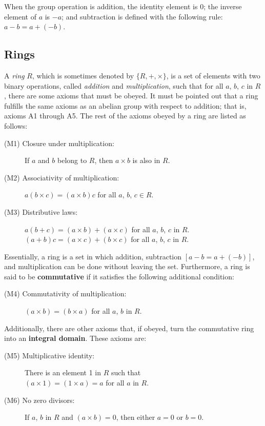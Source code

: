When the group operation is addition, the identity element is 0; the inverse element of $a$ is $-a$; and subtraction is defined with the following rule: $a-b = a+(-b)$. 
  
\subsection{Rings}

A \emph{ring} $R$, which is sometimes denoted by $\{R, +, \times \}$, is a set of elements with two binary operations, called \textit{addition} and \textit{multiplication}, such that for all $a$, $b$, $c$ in $R$, there are some axioms that must be obeyed. It must be pointed out that a ring fulfills the same axioms as an abelian group with respect to addition; that is, axioms A1 through A5. The rest of the axioms obeyed by a ring are listed as follows:
\begin{description}
\item[(M1) Closure under multiplication:] If $a$ and $b$ belong to $R$, then $a \times b$ is also in $R$.
\item[(M2) Associativity of multiplication:] $a(b \times c) = (a \times b)c$ for all $a$, $b$, $c \in R$.
\item[(M3) Distributive laws:] $a(b+c) = (a \times b) + (a \times c)$ for all $a$, $b$, $c$ in $R$. \\ $(a+b)c = (a \times c) + (b \times c)$ for all $a$, $b$, $c$ in $R$.
\end{description}

Essentially, a ring is a set in which addition, subtraction $[a-b = a + (-b)]$, and multiplication can be done without leaving the set. Furthermore, a ring is said to be \textbf{commutative} if it satisfies the following additional condition:
\begin{description}
\item[(M4) Commutativity of multiplication:] $(a \times b) = (b \times a)$ for all $a$, $b$ in $R$.
\end{description}

Additionally, there are other axioms that, if obeyed, turn the commutative ring into an \textbf{integral domain}. These axioms are:  
\begin{description}
\item[(M5) Multiplicative identity:] There is an element 1 in $R$ such that \\ $(a \times 1) = (1 \times a) = a$ for all $a$ in $R$.
\item[(M6) No zero divisors:] If $a$, $b$ in $R$ and $(a \times b)=0$, then either $a=0$ or $b=0$.
\end{description}

